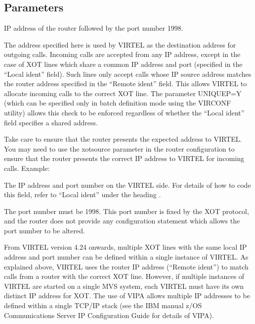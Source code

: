 \documentclass[letterpaper,10pt,english]{sphinxmanual}
\begin{document}
\subsection{Parameters}
\label{\detokenize{connectivity_guide:index-52}}\label{\detokenize{connectivity_guide:id22}}\begin{description}
\sphinxAtStartPar
IP address of the router followed by the port number 1998.

\sphinxAtStartPar
The address specified here is used by VIRTEL as the destination address for outgoing calls. Incoming calls are accepted from any IP address, except in the case of XOT lines which share a common IP address and port (specified in the “Local ident” field). Such lines only accept calls whose IP source address matches the router address specified in the “Remote ident” field. This allows VIRTEL to allocate incoming calls to the correct XOT line. The parameter UNIQUEP=Y (which can be specified only in batch definition mode
using the VIRCONF utility) allows this check to be enforced regardless of whether the “Local ident” field specifies a shared
address.
\begin{description}
\sphinxAtStartPar
Take care to ensure that the router presents the expected address to VIRTEL. You may need to use the xot\sphinxhyphen{}source parameter in the router configuration to ensure that the router presents the correct IP address to VIRTEL for incoming calls. Example:

\end{description}

\begin{sphinxVerbatim}[commandchars=\\\{\}]
      
\end{sphinxVerbatim}

\sphinxAtStartPar
The IP address and port number on the VIRTEL side. For details of how to code this field, refer to “Local ident” under the heading .

\sphinxAtStartPar
The port number must be 1998. This port number is fixed by the XOT protocol, and the router does not provide any configuration statement which allows the port number to be altered.

\sphinxAtStartPar
From VIRTEL version 4.24 onwards, multiple XOT lines with the same local IP address and port number can be defined within a single instance of VIRTEL. As explained above, VIRTEL uses the router IP address (“Remote ident”) to match calls from a router with the correct XOT line. However, if multiple instances of VIRTEL are started on a single MVS system, each VIRTEL must have its own distinct IP address for XOT. The use of VIPA allows multiple IP addresses to be defined within a single TCP/IP stack (see the IBM manual z/OS Communications Server IP Configuration Guide for details of VIPA).


\end{description}
\end{document}
